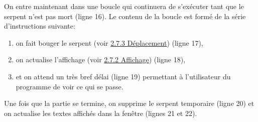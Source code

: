 \documentclass[12pt, a4paper, openany]{book}
\begin{document}
On entre maintenant dans une boucle qui continuera de s'exécuter tant que le serpent n'est pas mort (ligne 16). Le contenu de la boucle est formé de la série d'instructions suivante:
\begin{enumerate}
	\item on fait bouger le serpent (voir \hyperref[r:2.7.3-dep]{2.7.3 Déplacement}) (ligne 17),
	\item on actualise l'affichage (voir \hyperref[r:2.7.2-aff]{2.7.2 Affichage}) (ligne 18),
	\item et on attend un très bref délai (ligne 19) permettant à l'utilisateur du programme de voir ce qui se passe.
\end{enumerate}
Une fois que la partie se termine, on supprime le serpent temporaire (ligne 20) et on actualise les textes affichés dans la fenêtre (lignes 21 et 22).
\end{document}
